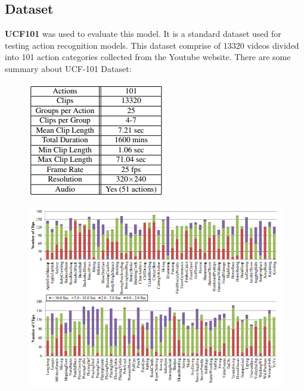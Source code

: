 \subsection{Dataset}
\textbf{UCF101}  was used to evaluate this model. It is a standard dataset used for testing action recognition models. This dataset comprise of 13320 videos divided into 101 action categories collected from the Youtube website.
There are some summary about UCF-101 Dataset:
\begin{center}
	\begin{figure}[H]
		\centering
		\includegraphics[width=0.4\columnwidth]{images/chap3/ucf-sum.png}
		\label{chap3:ucf-sum}
	\end{figure}
\end{center}
\begin{center}
	\begin{figure}[H]
		\centering
		\includegraphics[width=1\columnwidth]{images/chap3/ucf-sum-chart-2.png}
		\label{chap3:ucf-sum-chart-2}
	\end{figure}
\end{center}
